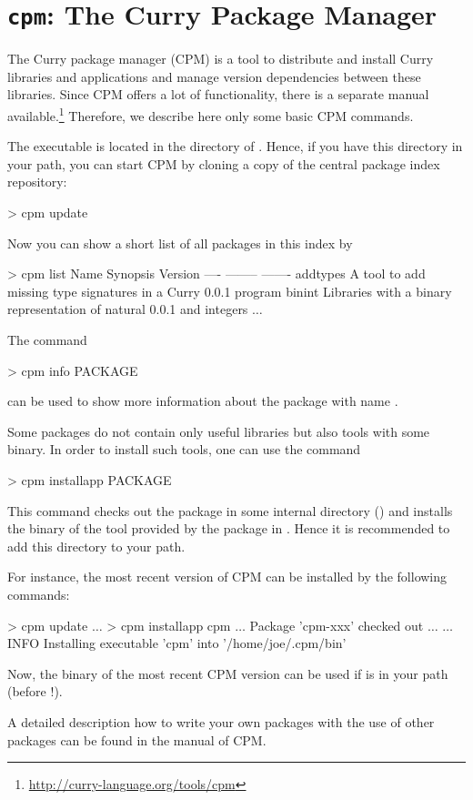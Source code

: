 \section{\texttt{cpm}: The Curry Package Manager}
\label{sec-cpm}

The Curry package manager (CPM) is a tool to
distribute and install Curry libraries and applications
and manage version dependencies between these libraries.
Since CPM offers a lot of functionality, there is a separate
manual available.\footnote{\url{http://curry-language.org/tools/cpm}}
Therefore, we describe here only some basic CPM commands.

The executable  is located in the  directory
of \CYS. Hence, if you have this directory in your path,
you can start CPM by cloning a copy of the central package index repository:
%
\begin{curry}
> cpm update
\end{curry}
%
Now you can show a short list of all packages in this index by
%
\begin{curry}
> cpm list
Name             Synopsis                                             Version   
----             --------                                             -------   
addtypes         A tool to add missing type signatures in a Curry     0.0.1     
                 program                                                        
binint           Libraries with a binary representation of natural    0.0.1     
                 and integers                                                   
$\ldots$
\end{curry}
%
The command
%
\begin{curry}
> cpm info PACKAGE
\end{curry}
%
can be used to show more information about the package with name
.

Some packages do not contain only useful libraries
but also tools with some binary. In order to install such tools,
one can use the command
%
\begin{curry}
> cpm installapp PACKAGE
\end{curry}
%
This command checks out the package in some internal directory
()
and installs the binary of the tool provided by the package
in .
Hence it is recommended to add this directory to your path.

For instance, the most recent version of CPM
can be installed by the following commands:
%
\begin{curry}
> cpm update
$\ldots$
> cpm installapp cpm
$\ldots$ Package 'cpm-xxx' checked out $\ldots$
$\ldots$
INFO  Installing executable 'cpm' into '/home/joe/.cpm/bin'
\end{curry}
%
Now, the binary  of the most recent CPM version can be used
if  is in your path
(before !).

A detailed description how to write your own packages
with the use of other packages can be found in the manual of CPM.


